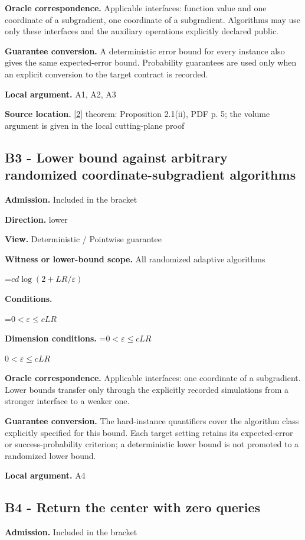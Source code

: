 \documentclass[10pt,a4paper]{article}
\newcommand{\AtlasMath}[1]{\par\begingroup\centering\setbox0=\hbox{$\displaystyle #1$}\ifdim\wd0>1.4\linewidth\typeout{ATLAS WIDE FORMULA: \the\wd0}\fi\ifdim\wd0>\linewidth\resizebox{\linewidth}{!}{\box0}\else\box0\fi\par\endgroup}
\newcommand{\AtlasInlineMath}[1]{\begingroup\setbox0=\hbox{$#1$}\ifdim\wd0>.4\linewidth\endgroup\AtlasMath{#1}\else\endgroup$#1$\fi}
\begin{document}
\textbf{Oracle correspondence.} Applicable interfaces: function value and one coordinate of a subgradient, one coordinate of a subgradient. Algorithms may use only these interfaces and the auxiliary operations explicitly declared public.

\textbf{Guarantee conversion.} A deterministic error bound for every instance also gives the same expected-error bound. Probability guarantees are used only when an explicit conversion to the target contract is recorded.

\textbf{Local argument.} A1, A2, A3

\textbf{Source location.} \href{https://www2.isye.gatech.edu/~nemirovs/MOR_AccuracyCertificates.pdf}{[2]} theorem: Proposition 2.1(ii), PDF p. 5; the volume argument is given in the local cutting-plane proof

\subsection{B3 - Lower bound against arbitrary randomized coordinate-subgradient algorithms}
\textbf{Admission.} Included in the bracket

\textbf{Direction.} lower

\textbf{View.} Deterministic / Pointwise guarantee

\textbf{Witness or lower-bound scope.} All randomized adaptive algorithms

\AtlasMath{cd\log(2+LR/\varepsilon)}
\textbf{Conditions.} 
\AtlasMath{0<\varepsilon\le cLR}


\textbf{Dimension conditions.} \AtlasInlineMath{0<\varepsilon\le cLR}

\textbf{Oracle correspondence.} Applicable interfaces: one coordinate of a subgradient. Lower bounds transfer only through the explicitly recorded simulations from a stronger interface to a weaker one.

\textbf{Guarantee conversion.} The hard-instance quantifiers cover the algorithm class explicitly specified for this bound. Each target setting retains its expected-error or success-probability criterion; a deterministic lower bound is not promoted to a randomized lower bound.

\textbf{Local argument.} A4

\subsection{B4 - Return the center with zero queries}
\textbf{Admission.} Included in the bracket
\end{document}
